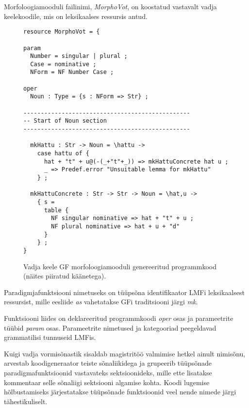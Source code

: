 \documentclass[12pt,a4paper]{article}
\begin{document}
Morfoloogiamooduli failinimi, \textit{MorphoVot}, on koostatud vastavalt vadja keele\-koodile, mis on leksikaalses ressursis antud.

\begin{figure}[ht]
  \center
\begin{verbatim}
resource MorphoVot = {

param
  Number = singular | plural ;
  Case = nominative ;
  NForm = NF Number Case ;

oper
  Noun : Type = {s : NForm => Str} ;

------------------------------------------------
-- Start of Noun section
------------------------------------------------

  mkHattu : Str -> Noun = \hattu -> 
    case hattu of {
      hat + "t" + u@(-(_+"t"+_)) => mkHattuConcrete hat u ;
      _ => Predef.error "Unsuitable lemma for mkHattu"
    } ;
  
  mkHattuConcrete : Str -> Str -> Noun = \hat,u -> 
    { s =
      table {
        NF singular nominative => hat + "t" + u ;
        NF plural nominative => hat + u + "d"
      }
    } ;
}
\end{verbatim}
\caption{Vadja keele GF morfoloogia\-mooduli genereeritud programmkood (näites piiratud käänetega).
  \label{code:gf-morfoloogia}}
\end{figure}

Paradigmjafunktsiooni nimetuseks on tüüpsõna identifikaator LMFi leksikaalsest ressursist, mille eesliide \textit{as} vahetatakse GFi traditsiooni järgi \textit{mk}.

Funktsiooni liides on deklareeritud programmkoodi \textit{oper} osas ja parameetrite tüübid \textit{param} osas. Parameetrite nimetused ja kategooriad peegeldavad grammatilisi tunnuseid LMFis.

Kuigi vadja vormisõnastik sisaldab magistritöö valmimise hetkel ainult nimisõnu, arvestab koodi\-generaator teiste sõna\-liikidega ja grupeerib tüüpsõnade paradigma\-funktsioonid vastavateks sektsioonideks, mille ette lisatakse kommentaar selle sõnaliigi sektsiooni algamise kohta. Koodi lugemise hõlbustamiseks järjestatakse tüüpsõnade funktsioonid veel nende nimede järgi tähestikuliselt. 
\end{document}
